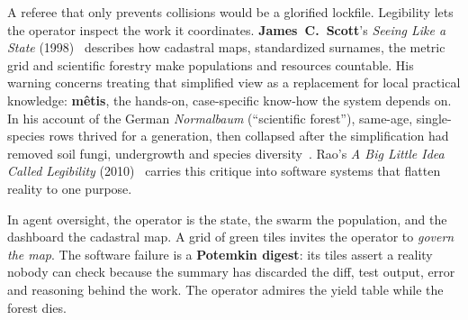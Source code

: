 \documentclass[11pt,a4paper]{article}
\theoremstyle{definition}
\theoremstyle{plain}
\begin{document}
%
A referee that only prevents collisions would be a glorified lockfile. Legibility
lets the operator inspect the work it coordinates. \textbf{James~C.\ Scott}'s
\emph{Seeing Like a State} (1998)~ describes how cadastral maps,
standardized surnames, the metric grid and scientific forestry make populations
and resources countable. His warning concerns treating that simplified view as a
replacement for local practical knowledge: \textbf{m\^etis}, the hands-on,
case-specific know-how the system depends on. In his account of the German
\emph{Normalbaum} (``scientific forest''), same-age, single-species rows thrived
for a generation, then collapsed after the simplification had removed soil fungi,
undergrowth and species diversity~. Rao's \emph{A Big Little Idea
Called Legibility} (2010)~ carries this critique into software
systems that flatten reality to one purpose.

In agent oversight, the operator is the state, the swarm the population, and the
dashboard the cadastral map. A grid of green tiles invites the operator to
\emph{govern the map}. The software failure is a \textbf{Potemkin digest}: its
tiles assert a reality nobody can check because the summary has discarded the
diff, test output, error and reasoning behind the work. The operator admires the
yield table while the forest dies.
\end{document}

